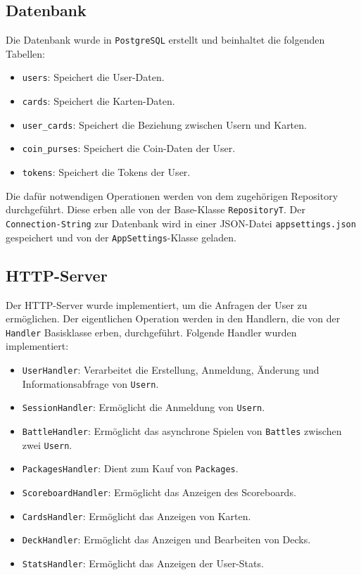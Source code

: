 \documentclass[a4paper, 12pt]{article}
\begin{document}
\subsection{Datenbank}
Die Datenbank wurde in \texttt{PostgreSQL} erstellt und beinhaltet die folgenden Tabellen:
\begin{itemize}
    \item \texttt{users}: Speichert die User-Daten.
    \item \texttt{cards}: Speichert die Karten-Daten.
    \item \texttt{user\_cards}: Speichert die Beziehung zwischen Usern und Karten.
    \item \texttt{coin\_purses}: Speichert die Coin-Daten der User.
    \item \texttt{tokens}: Speichert die Tokens der User.
\end{itemize}
Die dafür notwendigen Operationen werden von dem zugehörigen Repository durchgeführt. Diese erben alle von der Base-Klasse \texttt{RepositoryT}.
Der \texttt{Connection-String} zur Datenbank wird in einer JSON-Datei \texttt{appsettings.json} gespeichert und von der \texttt{AppSettings}-Klasse geladen.

\subsection{HTTP-Server}
Der HTTP-Server wurde implementiert, um die Anfragen der User zu ermöglichen. Der eigentlichen Operation werden in den Handlern, die von der \texttt{Handler} Basisklasse erben, durchgeführt. Folgende Handler wurden implementiert:
\begin{itemize}
    \item \texttt{UserHandler}: Verarbeitet die Erstellung, Anmeldung, Änderung und Informationsabfrage von \texttt{Usern}.
    \item \texttt{SessionHandler}: Ermöglicht die Anmeldung von \texttt{Usern}.
    \item \texttt{BattleHandler}: Ermöglicht das asynchrone Spielen von \texttt{Battles} zwischen zwei \texttt{Usern}.
    \item \texttt{PackagesHandler}: Dient zum Kauf von \texttt{Packages}.
    \item \texttt{ScoreboardHandler}: Ermöglicht das Anzeigen des Scoreboards.
    \item \texttt{CardsHandler}: Ermöglicht das Anzeigen von Karten.
    \item \texttt{DeckHandler}: Ermöglicht das Anzeigen und Bearbeiten von Decks.
    \item \texttt{StatsHandler}: Ermöglicht das Anzeigen der User-Stats.
\end{itemize}
\end{document}
